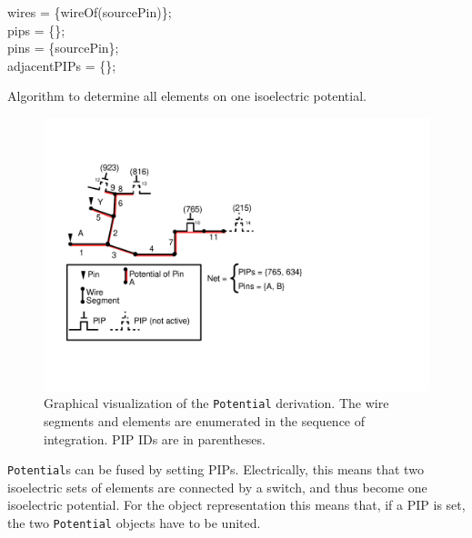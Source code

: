 \begin{algorithm}[h]
	wires = \{wireOf(sourcePin)\};\\
	pips = \{\};\\
	pins = \{sourcePin\};\\
	adjacentPIPs = \{\};\\
	
 \caption{Algorithm to determine all elements on one isoelectric potential.}
 \label{alg:findingpotential}
\end{algorithm}

\begin{figure}
\centering
\includegraphics[scale=0.8]{images/buildpotential_buildup.pdf}
\caption{Graphical visualization of the \texttt{Potential} derivation. The wire segments and elements are enumerated in the sequence of integration. PIP IDs are in parentheses.}
\label{fig:buildpotential}
\end{figure}



\texttt{Potential}s can be fused by setting PIPs. Electrically, this means that two isoelectric sets of elements are connected by a switch, and thus become one isoelectric potential. For the object representation this means that, if a PIP is set, the two \texttt{Potential} objects have to be united.

